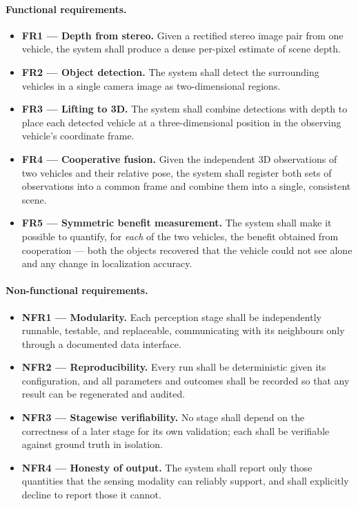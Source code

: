 \paragraph{Functional requirements.}
\begin{itemize}[leftmargin=*,itemsep=3pt]
  \item \textbf{FR1 --- Depth from stereo.} Given a rectified stereo image pair
  from one vehicle, the system shall produce a dense per-pixel estimate of scene
  depth.
  \item \textbf{FR2 --- Object detection.} The system shall detect the surrounding
  vehicles in a single camera image as two-dimensional regions.
  \item \textbf{FR3 --- Lifting to 3D.} The system shall combine detections with
  depth to place each detected vehicle at a three-dimensional position in the
  observing vehicle's coordinate frame.
  \item \textbf{FR4 --- Cooperative fusion.} Given the independent 3D observations
  of two vehicles and their relative pose, the system shall register both sets of
  observations into a common frame and combine them into a single, consistent
  scene.
  \item \textbf{FR5 --- Symmetric benefit measurement.} The system shall make it
  possible to quantify, for \emph{each} of the two vehicles, the benefit obtained
  from cooperation --- both the objects recovered that the vehicle could not see
  alone and any change in localization accuracy.
\end{itemize}

\paragraph{Non-functional requirements.}
\begin{itemize}[leftmargin=*,itemsep=3pt]
  \item \textbf{NFR1 --- Modularity.} Each perception stage shall be independently
  runnable, testable, and replaceable, communicating with its neighbours only
  through a documented data interface.
  \item \textbf{NFR2 --- Reproducibility.} Every run shall be deterministic given
  its configuration, and all parameters and outcomes shall be recorded so that any
  result can be regenerated and audited.
  \item \textbf{NFR3 --- Stagewise verifiability.} No stage shall depend on the
  correctness of a later stage for its own validation; each shall be verifiable
  against ground truth in isolation.
  \item \textbf{NFR4 --- Honesty of output.} The system shall report only those
  quantities that the sensing modality can reliably support, and shall explicitly
  decline to report those it cannot.
\end{itemize}

